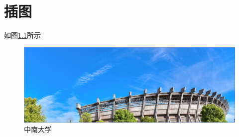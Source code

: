 \chapter{插图}
如图\ref{fig:csu}所示

\begin{figure}[H]
	\centering
	\includegraphics[width=0.8\linewidth]{figures/csu}
	\caption{中南大学}
	\label{fig:csu}%
\end{figure}